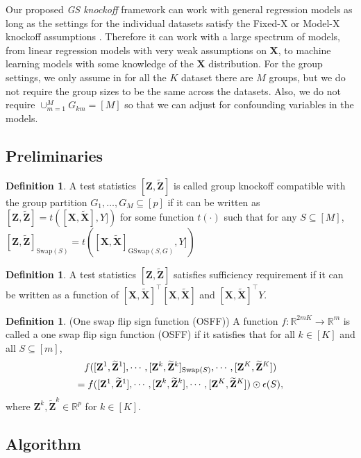 \documentclass[11pt]{article}
\theoremstyle{plain}
\theoremstyle{definition}
\newtheorem{definition}[theorem]{Definition}
\theoremstyle{remark}
\def\R{\mathbb{R}}
\def\R{\mathbb{R}}
\def\Z{\mathbf{Z}}
\newcommand{\X}{\mathbf{X}}
\newcommand{\0}{\mathbf{0}}
\begin{document}
Our proposed \textit{GS knockoff} framework can work with general regression models as long as the settings for the individual datasets satisfy the Fixed-X or Model-X knockoff assumptions \citep{barber2015, candes2018}. Therefore it can work with a large spectrum of models, from linear regression models with very weak assumptions on $\X$, to machine learning models with some knowledge of the $\X$ distribution. For the group settings, we only assume in for all the $K$ dataset there are $M$ groups, but we do not require the group sizes to be the same across the datasets. Also, we do not require $\cup_{m=1}^M G_{km}=[M]$ so that we can adjust for confounding variables in the models. 

\subsection{Preliminaries}
\begin{definition}
A test statistics $[\Z, \widetilde{\Z}]$ is called group knockoff compatible with the group partition $G_1,\dots,G_M\subseteq[p]$ if it can be written as $[\Z, \widetilde{\Z}]=t([\X,\widetilde{\X}],Y])$ for some function $t(\cdot)$ such that for any $S\subseteq[M]$, $[\Z, \widetilde{\Z}]_{\text{Swap}(S)}=t([\X,\widetilde{\X}]_{\text{GSwap}(S,G)},Y])$
\end{definition}
\begin{definition}
A test statistics $[\Z, \widetilde{\Z}]$ satisfies sufficiency requirement if it can be written as a function of $[\X,\widetilde{\X}]^\top [\X,\widetilde{\X}]$ and $[\X,\widetilde{\X}]^\top Y$.
\end{definition}
\begin{definition}\label{def:one-swap-flip}
(One swap flip sign function (OSFF)) A function $f: \R^{2mK}\rightarrow \R^{m}$ is called a one swap flip sign function (OSFF) if it satisfies that for all $k\in [K]$ and all $S \subseteq[m]$, \begin{multline*}
    f([\Z^1,\widetilde{\Z}^1],\cdots,[\Z^k,\widetilde{\Z}^k]_{\textnormal{Swap}(S)},\cdots,[\Z^K,\widetilde{\Z}^K])\\=f([\Z^1,\widetilde{\Z}^1],\cdots,[\Z^k,\widetilde{\Z}^k],\cdots,[\Z^K,\widetilde{\Z}^K])\odot \epsilon(S),
\end{multline*}
where $\Z^k,\widetilde{\Z}^k \in \R^p$ for $k \in [K]$.
\end{definition}

\subsection{Algorithm}\label{sec:algorithm}
\end{document}
